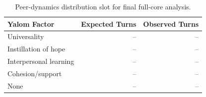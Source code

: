 \begin{table}[t]
\centering
\footnotesize
\setlength{\tabcolsep}{3pt}
\begin{tabular}{lrr}
\toprule
Yalom Factor & Expected Turns & Observed Turns \\
\midrule
Universality & -- & -- \\
Instillation of hope & -- & -- \\
Interpersonal learning & -- & -- \\
Cohesion/support & -- & -- \\
None & -- & -- \\
\bottomrule
\end{tabular}
\caption{Peer-dynamics distribution slot for final full-core analysis.}
\label{tab:y_distribution}
\end{table}
